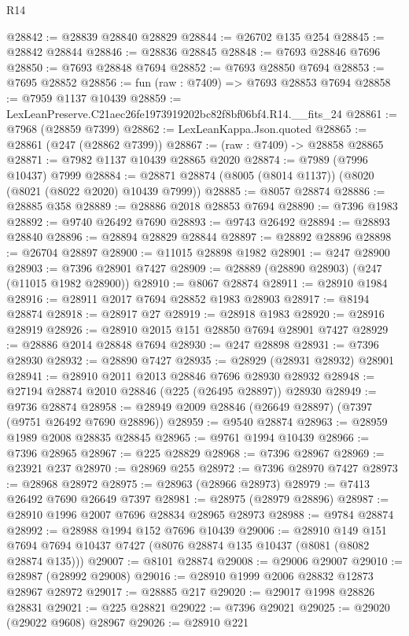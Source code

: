 \begin{lexlean}{R14}
\begin{coremodule}
@28842 := @28839 @28840 @28829
@28844 := @26702 @135 @254
@28845 := @28842 @28844
@28846 := @28836 @28845
@28848 := @7693 @28846 @7696
@28850 := @7693 @28848 @7694
@28852 := @7693 @28850 @7694
@28853 := @7695 @28852
@28856 := fun (raw : @7409) => @7693 @28853 @7694
@28858 := @7959 @1137 @10439
@28859 := LexLeanPreserve.C21aec26fe1973919202bc82f8bf06bf4.R14.__fits_24
@28861 := @7968 (@28859 @7399)
@28862 := LexLeanKappa.Json.quoted
@28865 := @28861 (@247 (@28862 @7399))
@28867 := (raw : @7409) -> @28858 @28865
@28871 := @7982 @1137 @10439 @28865 @2020
@28874 := @7989 (@7996 @10437) @7999
@28884 := @28871 @28874 (@8005 (@8014 @1137)) (@8020 (@8021 (@8022 @2020) @10439 @7999))
@28885 := @8057 @28874
@28886 := @28885 @358
@28889 := @28886 @2018 @28853 @7694
@28890 := @7396 @1983
@28892 := @9740 @26492 @7690
@28893 := @9743 @26492
@28894 := @28893 @28840
@28896 := @28894 @28829 @28844
@28897 := @28892 @28896
@28898 := @26704 @28897
@28900 := @11015 @28898 @1982
@28901 := @247 @28900
@28903 := @7396 @28901 @7427
@28909 := @28889 (@28890 @28903) (@247 (@11015 @1982 @28900))
@28910 := @8067 @28874
@28911 := @28910 @1984
@28916 := @28911 @2017 @7694 @28852 @1983 @28903
@28917 := @8194 @28874
@28918 := @28917 @27
@28919 := @28918 @1983
@28920 := @28916 @28919
@28926 := @28910 @2015 @151 @28850 @7694 @28901 @7427
@28929 := @28886 @2014 @28848 @7694
@28930 := @247 @28898
@28931 := @7396 @28930
@28932 := @28890 @7427
@28935 := @28929 (@28931 @28932) @28901
@28941 := @28910 @2011 @2013 @28846 @7696 @28930 @28932
@28948 := @27194 @28874 @2010 @28846 (@225 (@26495 @28897)) @28930
@28949 := @9736 @28874
@28958 := @28949 @2009 @28846 (@26649 @28897) (@7397 (@9751 @26492 @7690 @28896))
@28959 := @9540 @28874
@28963 := @28959 @1989 @2008 @28835 @28845
@28965 := @9761 @1994 @10439
@28966 := @7396 @28965
@28967 := @225 @28829
@28968 := @7396 @28967
@28969 := @23921 @237
@28970 := @28969 @255
@28972 := @7396 @28970 @7427
@28973 := @28968 @28972
@28975 := @28963 (@28966 @28973)
@28979 := @7413 @26492 @7690 @26649 @7397
@28981 := @28975 (@28979 @28896)
@28987 := @28910 @1996 @2007 @7696 @28834 @28965 @28973
@28988 := @9784 @28874
@28992 := @28988 @1994 @152 @7696 @10439
@29006 := @28910
    @149
    @151
    @7694
    @7694
    @10437
    @7427
    (@8076 @28874 @135 @10437 (@8081 (@8082 @28874 @135)))
@29007 := @8101 @28874
@29008 := @29006 @29007
@29010 := @28987 (@28992 @29008)
@29016 := @28910 @1999 @2006 @28832 @12873 @28967 @28972
@29017 := @28885 @217
@29020 := @29017 @1998 @28826 @28831
@29021 := @225 @28821
@29022 := @7396 @29021
@29025 := @29020 (@29022 @9608) @28967
@29026 := @28910 @221

\end{coremodule}
\end{lexlean}
